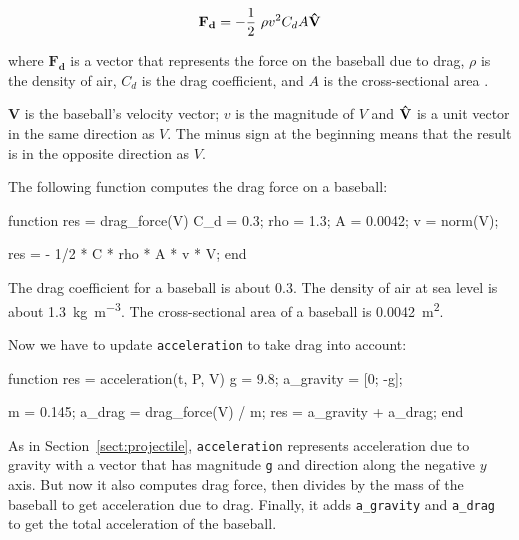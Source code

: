 \documentclass[
]{book}
\numberwithin{Answer}{chapter}
\numberwithin{Exercise}{chapter}
\renewcommand{\vec}[1]{\bm{\mathbf{#1}}}
\newcommand{\uveci}{{\bm{\hat{\textnormal{\bfseries\i}}}}}
\newcommand{\uvecj}{{\bm{\hat{\textnormal{\bfseries\j}}}}}
\newcommand{\uvec}[1]{%
    \ifthenelse{\equal{#1}{i}}%
        {\uveci}{%
    \ifthenelse{\equal{#1}{j}}%
        {\uvecj}{%
    {\bm{\hat{\mathbf{#1}}}}%
}}}
\begin{document}
\begin{equation}
    \vec{F_d} = - \frac{1}{2} ~ \rho v^2 C_d A \uvec{V}
\end{equation}

where $\vec{F_d}$ is a vector that represents the force on the baseball
due to drag, 
$\rho$ is the density of air, 
$C_d$ is the drag coefficient, and
$A$ is the cross-sectional area .


$\vec{V}$ is the baseball's velocity vector; $v$ is the magnitude of $V$ and $\uvec{V}$ is a unit vector in the same direction as $V$.  The minus sign at the beginning means that the result is in the opposite direction as $V$.


The following function computes the drag force on a baseball:

\begin{code}
 function res = drag_force(V)
    C_d = 0.3;      %
    rho = 1.3;      %
    A = 0.0042;     %
    v = norm(V);    %

    res = - 1/2 * C * rho * A * v * V;
end
\end{code}
  
The drag coefficient for a baseball is about 0.3.  
The density of air at sea level is about \SI{1.3}{\kilogram\per\meter\cubed}.
The cross-sectional area of a baseball is \SI{0.0042}{\meter\squared}.


Now we have to update {\tt acceleration} to take drag into account:

\begin{code}
function res = acceleration(t, P, V)
    g = 9.8;                       %
    a_gravity = [0; -g];

    m = 0.145;                     %
    a_drag = drag_force(V) / m;
    res = a_gravity + a_drag;
end
\end{code}

As in Section~\ref{sect:projectile}, {\tt acceleration} represents acceleration due to gravity with a vector that has magnitude {\tt g} and direction along the negative $y$ axis.
But now it also computes drag force, then divides by the mass of the baseball to get acceleration due to drag.
Finally, it adds \verb"a_gravity" and \verb"a_drag" to get the total acceleration of the baseball.
\end{document}
